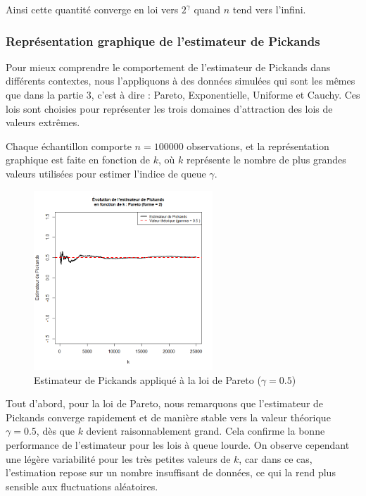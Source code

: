\documentclass{article}
\theoremstyle{plain}
\theoremstyle{definition}
\theoremstyle{plain}
\begin{document}
Ainsi cette quantité converge en loi vers $2^{\gamma}$ quand $n$ tend vers l’infini.

\subsubsection{Représentation graphique de l’estimateur de Pickands}

Pour mieux comprendre le comportement de l’estimateur de Pickands dans différents contextes, nous l’appliquons à des données simulées qui sont les mêmes que dans la partie 3, c'est à dire : Pareto, Exponentielle, Uniforme et Cauchy. Ces lois sont choisies pour représenter les trois domaines d’attraction des lois de valeurs extrêmes.

Chaque échantillon comporte $n = 100000$ observations, et la représentation graphique est faite en fonction de $k$, où \(k\) représente le nombre de plus grandes valeurs utilisées pour estimer l’indice de queue \(\gamma\).

\begin{figure}[H]
    \centering
    \includegraphics[width=0.6\textwidth]{./Evolution des estimateurs/pickands/estimateur_pickands_pareto.png}
    \caption{Estimateur de Pickands appliqué à la loi de Pareto ($\gamma = 0.5$)}
\end{figure}
Tout d'abord, pour la loi de Pareto, nous remarquons que l'estimateur de Pickands converge rapidement et de manière stable vers la valeur théorique \(\gamma = 0.5\), dès que \(k\) devient raisonnablement grand. Cela confirme la bonne performance de l’estimateur pour les lois à queue lourde. On observe cependant une légère variabilité pour les très petites valeurs de \(k\), car dans ce cas, l’estimation repose sur un nombre insuffisant de données, ce qui la rend plus sensible aux fluctuations aléatoires.
\end{document}
